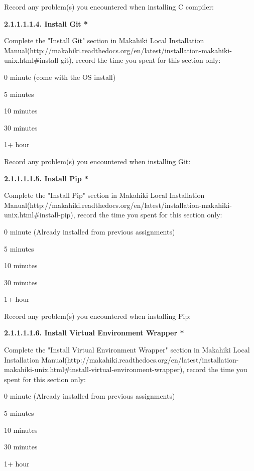 Record any problem(s) you encountered when installing C compiler:

{\bf 2.1.1.1.1.4. Install Git *}

Complete the "Install Git" section in Makahiki Local Installation Manual(http://makahiki.readthedocs.org/en/latest/installation-makahiki-unix.html\#install-git), record the time you spent for this section only:

\begin{compactitem}
\item 0 minute (come with the OS install)
\item 5 minutes
\item  10 minutes
\item  30 minutes
\item  1+ hour
\end{compactitem}

Record any problem(s) you encountered when installing Git:

{\bf 2.1.1.1.1.5. Install Pip *}

Complete the "Install Pip" section in Makahiki Local Installation Manual(http://makahiki.readthedocs.org/en/latest/installation-makahiki-unix.html\#install-pip), record the time you spent for this section only:

\begin{compactitem}
\item 0 minute (Already installed from previous assignments)
\item 5 minutes
\item  10 minutes
\item  30 minutes
\item  1+ hour
\end{compactitem}

Record any problem(s) you encountered when installing Pip:

{\bf 2.1.1.1.1.6. Install Virtual Environment Wrapper *}

Complete the "Install Virtual Environment Wrapper" section in Makahiki Local Installation Manual(http://makahiki.readthedocs.org/en/latest/installation-makahiki-unix.html\#install-virtual-environment-wrapper), record the time you spent for this section only:

\begin{compactitem}
\item 0 minute (Already installed from previous assignments)
\item 5 minutes
\item  10 minutes
\item  30 minutes
\item  1+ hour
\end{compactitem}


